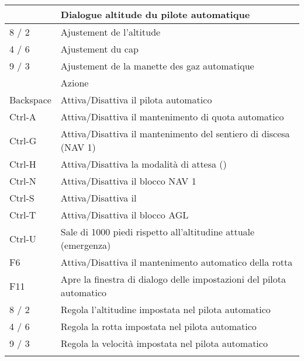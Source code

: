 \begin{tabular}{|l|l|}
{    F11           &         Dialogue altitude du pilote automatique\\\hline
    8 / 2         &         Ajustement de l'altitude\\
    4 / 6         &         Ajustement du cap\\
    9 / 3         &         Ajustement de la manette des gaz automatique \\\hline
}{}
\IfLanguageName{italian}{
Pulsante/i     &  Azione\\\hline
    Backspace     &         Attiva/Disattiva il pilota automatico\\
    Ctrl-A        &         Attiva/Disattiva il mantenimento di quota automatico\\
    Ctrl-G        &         Attiva/Disattiva il mantenimento del sentiero di discesa (NAV 1)\\
    Ctrl-H        &         Attiva/Disattiva la modalit\`{a} di attesa (\index{volo in tondo})\\
    Ctrl-N        &         Attiva/Disattiva il blocco NAV 1\\
    Ctrl-S        &         Attiva/Disattiva il \index{controllo automatico della velocit\`{a}}\\
    Ctrl-T        &         Attiva/Disattiva il blocco AGL\\
    Ctrl-U        &         Sale di 1000 piedi rispetto all'altitudine attuale (emergenza)\\
    F6            &         Attiva/Disattiva il mantenimento automatico della rotta\\
    F11           &         Apre la finestra di dialogo delle impostazioni del pilota automatico\\\hline
    8 / 2         &         Regola l'altitudine impostata nel pilota automatico\\
    4 / 6         &         Regola la rotta impostata nel pilota automatico\\
    9 / 3         &         Regola la velocit\`{a} impostata nel pilota automatico\\\hline

}{}
\end{tabular}

